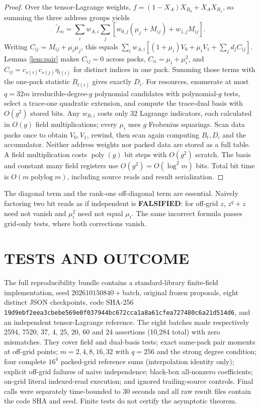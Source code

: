 \documentclass[11pt]{article}
\begin{document}
\begin{proof}
Over the tensor-Lagrange weights, $f=(1-X_A)X_{B_0}+X_AX_{B_1}$, so summing the three address groups yields
\[
 \widetilde f_m=\sum_iw_{A,i}\sum_j
 [w_{0,j}(\mu_j+M_{ij})+w_{1,j}M_{ij}].
\]
Writing $C_{ij}=M_{ij}+\mu_i\mu_j$, this equals
$\sum_iw_{A,i}[(1+\mu_i)V_0+\mu_iV_1+\sum_jd_jC_{ij}]$.
Lemma \ref{lem:pair} makes $C_{ij}=0$ across packs,
$C_{ii}=\mu_i+\mu_i^2$, and
$C_{ij}=c_{s(i)}c_{s(j)}\eta_{t(i)}$ for distinct indices in one pack. Summing those terms with the one-pack statistic $B_{t(i)}$ gives exactly $D_i$.
For resources, enumerate at most $q=32m$ irreducible-degree-$g$ polynomial candidates with polynomial-$g$ tests, select a trace-one quadratic extension, and compute the trace-dual basis with $O(g^2)$ stored bits. Any $w_{R,i}$ costs only 32 Lagrange indicators, each calculated in $O(g)$ field multiplications; every $\mu_i$ uses $g$ Frobenius squarings. Scan data packs once to obtain $V_0,V_1$, rewind, then scan again computing $B_t,D_i$ and the accumulator. Neither address weights nor packed data are stored as a full table. A field multiplication costs $\operatorname{poly}(g)$ bit steps with $O(g^2)$ scratch. The basis and constant many field registers use $O(g^2)=O(\log^2m)$ bits. Total bit time is $O(m\operatorname{polylog}m)$, including source reads and result serialization.
\end{proof}
The diagonal term and the rank-one off-diagonal term are essential. Naively factoring two bit reads as if independent is \textbf{FALSIFIED}: for off-grid $z$, $z^q+z$ need not vanish and $\mu_i^2$ need not equal $\mu_i$. The same incorrect formula passes grid-only tests, where both corrections vanish.

\section{TESTS AND OUTCOME}
The full reproducibility bundle contains a standard-library finite-field implementation, seed $202610150840+$batch, original frozen proposals, eight distinct JSON checkpoints, code SHA-256
\texttt{19d9ebf2eea3cbebe569e0f037944bc672cca1a8a61cfea727480c6a21d514d6}, and an independent tensor-Lagrange reference.
The eight batches made respectively 2594, 7520, 37, 4, 25, 20, 60 and 24 assertions (10,284 total) with zero mismatches. They cover field and dual-basis tests; exact same-pack pair moments at off-grid points; $m=2,4,8,16,32$ with $q=256$ and the strong degree condition; four complete $16^4$ packed-grid reference sums (interpolation identity only); explicit off-grid failures of naive independence; black-box all-nonzero coefficients; on-grid literal indexed-read execution; and ignored trailing-source controls. Final calls were separately time-bounded to 30 seconds and all raw result files contain the code SHA and seed. Finite tests do not certify the asymptotic theorem.
\end{document}
